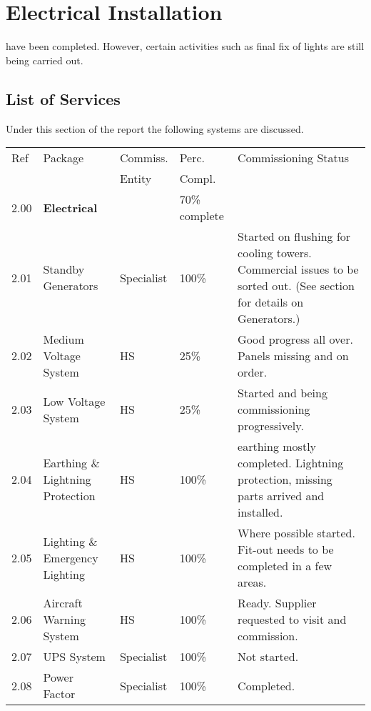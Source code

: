 \chapter{Electrical Installation}
\label{ch:electrical}

 have been completed. However, certain activities such as final fix of lights are still being carried out.  

\section{List of Services}
Under this section of the report the following systems are discussed.

\bgroup
\small
\label{chap:listofservices}

\begin{longtable}{llllp{3.9cm}}
\toprule
Ref	&Package	&Commiss.	&Perc. & Commissioning Status\\
     &         &Entity    &Compl.\\
\midrule
\midrule
2.00	&\textbf{Electrical}		&& 70\% complete\\
2.01	&Standby Generators	&Specialist&100\% & Started on flushing for cooling towers. Commercial issues to be sorted out. (See section for details on Generators.)\\	
2.02	&Medium Voltage System	&HS&25\% & Good progress all over. Panels missing and on order.\\	
2.03	&Low Voltage System		&HS&25\% & Started and being commissioning progressively.\\
2.04	&Earthing \& Lightning Protection &HS&100\% &earthing mostly completed. Lightning protection, missing parts arrived and installed. \\		
2.05	&Lighting \& Emergency Lighting  &HS&100\% & Where possible started. Fit-out needs to be completed in a few areas.\\		
2.06	&Aircraft Warning System &HS&100\% & Ready. Supplier requested to visit and commission. \\		
2.07	&UPS System	&Specialist&100\% & Not started.\\	
2.08  &Power Factor  &Specialist &100\% & Completed.\\
\midrule
\end{longtable}
\egroup




